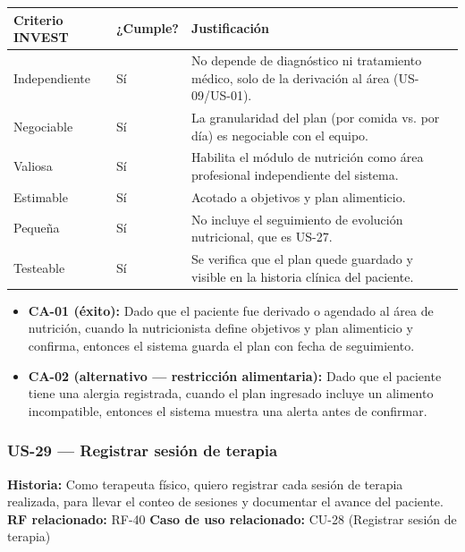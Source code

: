 \documentclass[11pt,a4paper]{article}
\providecommand{\tightlist}{%
	\setlength{\itemsep}{0pt}\setlength{\parskip}{0pt}}
\begin{document}
	\begin{longtable}{p{} p{} p{}}
		\toprule
		\textbf{Criterio INVEST} & \textbf{¿Cumple?} & \textbf{Justificación} \\
		\midrule
		\endhead
		Independiente & Sí & No depende de diagnóstico ni tratamiento médico, solo de la derivación al área (US-09/US-01). \\
		Negociable & Sí & La granularidad del plan (por comida vs. por día) es negociable con el equipo. \\
		Valiosa & Sí & Habilita el módulo de nutrición como área profesional independiente del sistema. \\
		Estimable & Sí & Acotado a objetivos y plan alimenticio. \\
		Pequeña & Sí & No incluye el seguimiento de evolución nutricional, que es US-27. \\
		Testeable & Sí & Se verifica que el plan quede guardado y visible en la historia clínica del paciente. \\
		\bottomrule
	\end{longtable}
	
	\begin{itemize}
		\tightlist
		\item \textbf{CA-01 (éxito):} Dado que el paciente fue derivado o agendado al área de nutrición, cuando la nutricionista define objetivos y plan alimenticio y confirma, entonces el sistema guarda el plan con fecha de seguimiento.
		\item \textbf{CA-02 (alternativo --- restricción alimentaria):} Dado que el paciente tiene una alergia registrada, cuando el plan ingresado incluye un alimento incompatible, entonces el sistema muestra una alerta antes de confirmar.
	\end{itemize}
	
	\subsubsection{US-29 --- Registrar sesión de terapia}
	
	\textbf{Historia:} Como terapeuta físico, quiero registrar cada sesión de terapia realizada, para llevar el conteo de sesiones y documentar el avance del paciente.
	\textbf{RF relacionado:} RF-40
	\textbf{Caso de uso relacionado:} CU-28 (Registrar sesión de terapia)
	
\end{document}
